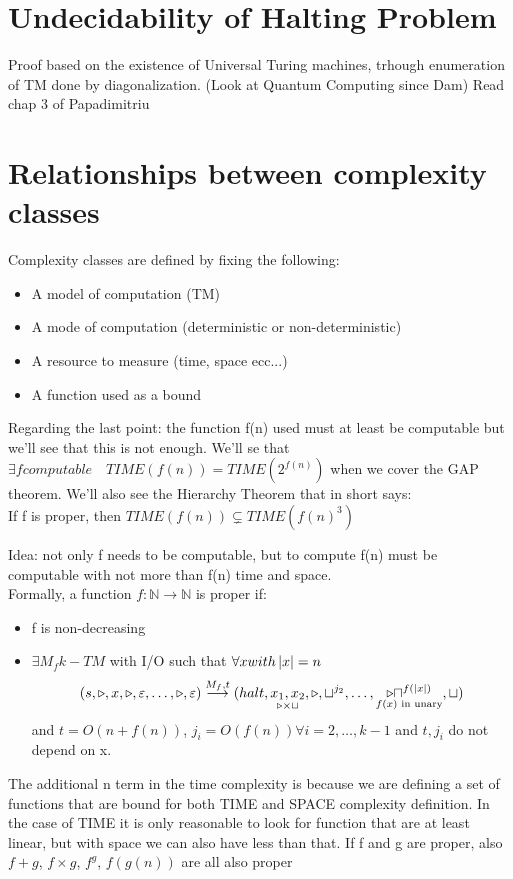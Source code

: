 \section{Undecidability of Halting Problem}
Proof based on the existence of Universal Turing machines, trhough enumeration of TM done by diagonalization. (Look at Quantum Computing since Dam) Read chap 3 of Papadimitriu

\section{Relationships between complexity classes}
Complexity classes are defined by fixing the following:
\begin{itemize}
    \item A model of computation (TM)
    \item A mode of computation (deterministic or non-deterministic)
    \item A resource to measure (time, space ecc...)
    \item A function used as a bound
\end{itemize}
Regarding the last point: the function f(n) used must at least be computable but we'll see that this is not enough. We'll se that $ \exists f computable \quad TIME(f(n)) = TIME(2^{f(n)}) $ when we cover the GAP theorem. We'll also see the Hierarchy Theorem that in short says: \\
If f is proper, then $TIME(f(n)) \subsetneq TIME(f(n)^3)$
\begin{definition}
    Idea: not only f needs to be computable, but to compute f(n) must be computable with not more than f(n) time and space.\\
    Formally, a function $ f: \mathbb{N}\longrightarrow \mathbb{N} $ is proper if: \begin{itemize}
        \item f is non-decreasing
        \item $ \exists M_f k-TM$ with I/O such that $ \forall x with \left\lvert x\right\rvert= n $
        \[ 
            (s,\triangleright, x ,\triangleright, \varepsilon, \ldots, \triangleright, \varepsilon) \overset{M_f,t}{\longrightarrow}(halt, \underset{\triangleright \times \sqcup}{x_1, x_2}, \triangleright, \sqcup^{j_2}, \ldots,  \underset{f(x) \text{ in unary}}{\triangleright \sqcap^{f(\left\lvert x\right\rvert)}}, \sqcup) 
        \]
        and $ t = O(n+f(n))$, $j_i = O(f(n)) \forall i= 2, \ldots,k-1$ and $t, j_i$ do not depend on x. 
    \end{itemize}
    The additional n term in the time complexity is because we are defining a set of functions that are bound for both TIME and SPACE complexity definition. In the case of TIME it is only reasonable to look for function that are at least linear, but with space we can also have less than that. If f and g are proper, also $f+g$, $f\times g$, $f^g$, $f(g(n))$ are all also proper
\end{definition}
